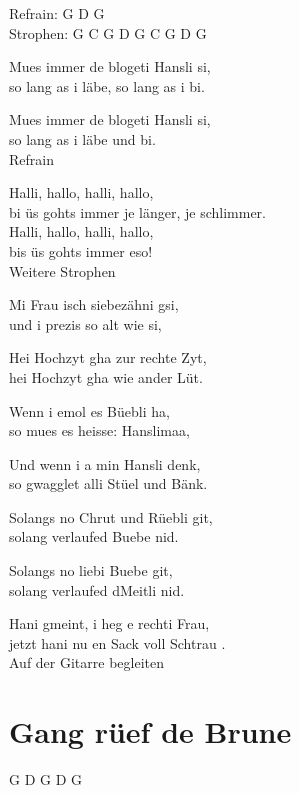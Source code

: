 \documentclass[
  letterpaper,
  a5paper]{memoir}
\begin{document}
Refrain: G D G\\
Strophen: G C G D G C G D G

Mues immer de blogeti Hansli si,\\
so lang as i läbe, so lang as i bi.

Mues immer de blogeti Hansli si,\\
so lang as i läbe und bi.\\
Refrain

\begin{tcolorbox}[enhanced jigsaw, breakable, bottomrule=.15mm, colframe=quarto-callout-color-frame, rightrule=.15mm, opacityback=0, colback=white, arc=.35mm, toprule=.15mm, leftrule=.75mm, left=2mm]

Halli, hallo, halli, hallo,\\
bi üs gohts immer je länger, je schlimmer.\\
Halli, hallo, halli, hallo,\\
bis üs gohts immer eso!\\
Weitere Strophen

\end{tcolorbox}

Mi Frau isch siebezähni gsi,\\
und i prezis so alt wie si,

Hei Hochzyt gha zur rechte Zyt,\\
hei Hochzyt gha wie ander Lüt.

Wenn i emol es Büebli ha,\\
so mues es heisse: Hanslimaa,

Und wenn i a min Hansli denk,\\
so gwagglet alli Stüel und Bänk.

Solangs no Chrut und Rüebli git,\\
solang verlaufed Buebe nid.

Solangs no liebi Buebe git,\\
solang verlaufed d\textquotesingle Meitli nid.

Hani gmeint, i heg e rechti Frau,\\
jetzt hani nu en Sack voll Schtrau .\\
Auf der Gitarre begleiten

\hypertarget{gang-ruxfcef-de-brune}{%
\chapter{Gang rüef de Brune}\label{gang-ruxfcef-de-brune}}

G D G D G
\end{document}

